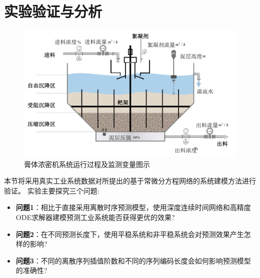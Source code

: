 \section{实验验证与分析}
\label{sec:case}

\begin{figure}[t]
\centering
\includegraphics[width=\linewidth]{figures/chapter3/thickener.pdf}
\caption{
膏体浓密机系统运行过程及监测变量图示
}
\label{fig:nfca_thickener}
\end{figure}

本节将采用真实工业系统数据对所提出的基于常微分方程网络的系统建模方法进行验证。
实验主要探究三个问题:
\begin{itemize}
\item \textbf{问题1}：相比于直接采用离散时序预测模型，使用深度连续时间网络和高精度ODE求解器建模预测工业系统能否获得更优的效果?
\item \textbf{问题2}：在不同预测长度下，使用平稳系统和非平稳系统会对预测效果产生怎样的影响?
\item \textbf{问题3}：不同的离散序列插值阶数和不同的序列编码长度会如何影响预测模型的准确性?
\end{itemize}

